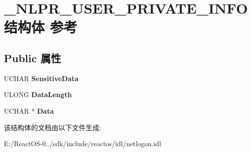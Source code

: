 \hypertarget{struct___n_l_p_r___u_s_e_r___p_r_i_v_a_t_e___i_n_f_o}{}\section{\+\_\+\+N\+L\+P\+R\+\_\+\+U\+S\+E\+R\+\_\+\+P\+R\+I\+V\+A\+T\+E\+\_\+\+I\+N\+F\+O结构体 参考}
\label{struct___n_l_p_r___u_s_e_r___p_r_i_v_a_t_e___i_n_f_o}
\subsection*{Public 属性}
\begin{DoxyCompactItemize}
\item 
\mbox{\label{struct___n_l_p_r___u_s_e_r___p_r_i_v_a_t_e___i_n_f_o_a266a5d740b4bd125623aa3c84d1c0b7d}} 
U\+C\+H\+AR {\bfseries Sensitive\+Data}
\item 
\mbox{\label{struct___n_l_p_r___u_s_e_r___p_r_i_v_a_t_e___i_n_f_o_aa80344c6ee617e7f78e825d1b310dc45}} 
U\+L\+O\+NG {\bfseries Data\+Length}
\item 
\mbox{\label{struct___n_l_p_r___u_s_e_r___p_r_i_v_a_t_e___i_n_f_o_ad932dbdefcdc60c480ccf61c4e8276b6}} 
U\+C\+H\+AR $\ast$ {\bfseries Data}
\end{DoxyCompactItemize}


该结构体的文档由以下文件生成\+:\begin{DoxyCompactItemize}
\item 
E\+:/\+React\+O\+S-\/0../sdk/include/reactos/idl/netlogon.\+idl\end{DoxyCompactItemize}
